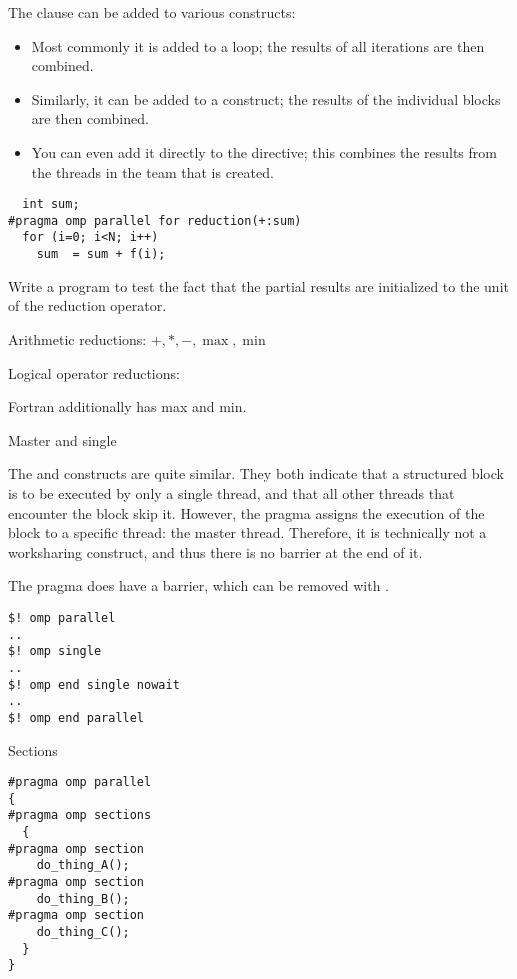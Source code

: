 The  clause can be added to various constructs:
\begin{itemize}
\item Most commonly it is added to a  loop; the results
  of all iterations are then combined.
\item Similarly, it can be added to a  construct;
  the results of the individual  blocks are then combined.
\item You can even add it directly to the  directive;
  this combines the results from the threads in the team that is created.
\end{itemize}

\begin{verbatim}
  int sum;
#pragma omp parallel for reduction(+:sum)
  for (i=0; i<N; i++)
    sum  = sum + f(i);
\end{verbatim}

\begin{exercise}
  Write a program to test the fact that the partial results
  are initialized to the unit of the reduction operator.
\end{exercise}

Arithmetic reductions: $+,*,-,\max,\min$

Logical operator reductions: \n{&,&&,|,||,^}

Fortran additionally has max and min.

 {Master and single}

The  and  constructs
are quite similar. They both indicate that a structured block
is to be executed by only a single thread, and that all other threads
that encounter the block skip it. However, the  pragma
assigns the execution of the block to a specific thread: the master thread.
Therefore, it is technically not a worksharing construct, and thus
there is no barrier at the end of it.

The  pragma does have a barrier, which can be removed with
.
\begin{verbatim}
$! omp parallel
..
$! omp single
..
$! omp end single nowait
..
$! omp end parallel
\end{verbatim}

 {Sections}

\begin{verbatim}
#pragma omp parallel
{
#pragma omp sections
  {
#pragma omp section
    do_thing_A();
#pragma omp section
    do_thing_B();
#pragma omp section
    do_thing_C();
  }
}
\end{verbatim}

